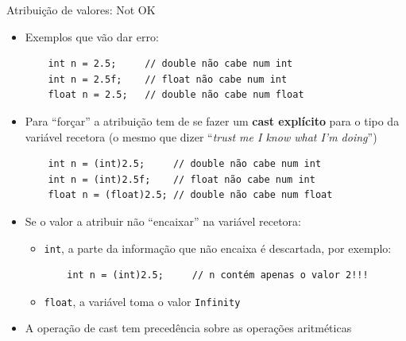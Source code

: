 \documentclass[portuguese, aspectratio=169, xcolor=table]{beamer}
\begin{document}
\begin{frame}[fragile]{Atribuição de valores: Not OK}
\begin{itemize}
\item Exemplos que vão dar erro:
\begin{verbatim}
    int n = 2.5;     // double não cabe num int
    int n = 2.5f;    // float não cabe num int
    float n = 2.5;   // double não cabe num float
\end{verbatim}
\item Para ``forçar'' a atribuição tem de se fazer um \textbf{cast explícito} para o tipo da variável recetora (o mesmo que dizer ``\textit{trust me I know what I'm doing}'')
\begin{verbatim}
    int n = (int)2.5;     // double não cabe num int
    int n = (int)2.5f;    // float não cabe num int
    float n = (float)2.5; // double não cabe num float
\end{verbatim}
\item Se o valor a atribuir não ``encaixar'' na variável recetora:
\begin{itemize}
\item \texttt{int}, a parte da informação que não encaixa é descartada, por exemplo:
\begin{verbatim}
    int n = (int)2.5;     // n contém apenas o valor 2!!!
\end{verbatim}
\item \texttt{float}, a variável toma o valor \texttt{Infinity}
\end{itemize}

\item A operação de cast tem precedência sobre as operações aritméticas
\end{itemize}
\end{frame}
\end{document}
